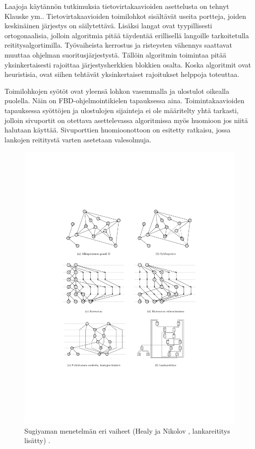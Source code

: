 \documentclass[finnish,12pt]{article}
\begin{document}
Laajoja käytännön tutkimuksia tietovirtakaavioiden asettelusta on tehnyt Klauske ym.\cite{RefWorks:50}.
Tietovirtakaavioiden toimilohkot sisältävät useita portteja, joiden keskinäinen järjestys on säilytettävä.
Lisäksi langat ovat tyypillisesti ortogonaalisia, jolloin algoritmia pitää täydentää erillisellä langoille tarkoitetulla reititysalgortimilla.
Työvaiheista kerrostus ja risteysten vähennys saattavat muuttaa ohjelman suoritusjärjestystä.
Tällöin algoritmin toimintaa pitää yksinkertaisesti rajoittaa järjestysherkkien blokkien osalta.
Koska algoritmit ovat heuristisia, ovat siihen tehtävät yksinkertaiset rajoitukset helppoja toteuttaa.

Toimilohkojen syötöt ovat yleensä lohkon vasemmalla ja ulostulot oikealla puolella.
Näin on FBD-ohjelmointikielen tapauksessa aina. %
Toimintakaavioiden tapauksessa syöttöjen ja ulostulojen sijainteja ei ole määritelty yhtä tarkasti, jolloin sivuportit on otettava asettelevassa algoritmissa myös huomioon jos niitä halutaan käyttää.
Sivuporttien huomioonottoon on esitetty ratkaisu, jossa lankojen reititystä varten asetetaan valesolmuja. \cite{RefWorks:51}

\newpage

\begin{figure}[!p]
\centering
\includegraphics[width=\textwidth]{hier.pdf}
\caption{Sugiyaman menetelmän eri vaiheet (Healy ja Nikolov \cite{RefWorks:70}, lankareititys lisätty) . }
\end{figure}
\end{document}
